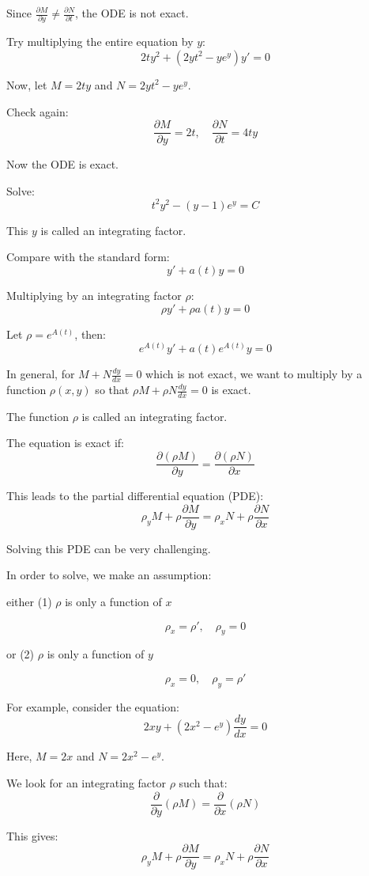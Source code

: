 \documentclass{article}
\begin{document}
Since \(\frac{\partial M}{\partial y} \neq \frac{\partial N}{\partial t}\), the ODE is not exact.

Try multiplying the entire equation by \( y \):
\[
2ty^2 + (2yt^2 - ye^y)y' = 0
\]

Now, let \( M = 2ty \) and \( N = 2yt^2 - ye^y \).

Check again:
\[
\frac{\partial M}{\partial y} = 2t, \quad \frac{\partial N}{\partial t} = 4ty
\]

Now the ODE is exact.

Solve:
\[
t^2y^2 - (y - 1)e^y = C
\]

This \( y \) is called an integrating factor.

Compare with the standard form:
\[
y' + a(t)y = 0
\]

Multiplying by an integrating factor \( \rho \):
\[
\rho y' + \rho a(t)y = 0
\]

Let \( \rho = e^{A(t)} \), then:
\[
e^{A(t)}y' + a(t)e^{A(t)}y = 0
\]

In general, for \( M + N \frac{dy}{dx} = 0 \) which is not exact, we want to multiply by a function \( \rho(x, y) \) so that \( \rho M + \rho N \frac{dy}{dx} = 0 \) is exact.

The function \( \rho \) is called an integrating factor.

The equation is exact if:
\[
\frac{\partial (\rho M)}{\partial y} = \frac{\partial (\rho N)}{\partial x}
\]

This leads to the partial differential equation (PDE):
\[
\rho_y M + \rho \frac{\partial M}{\partial y} = \rho_x N + \rho \frac{\partial N}{\partial x}
\]

Solving this PDE can be very challenging.

In order to solve, we make an assumption:

either (1) \(\rho\) is only a function of \(x\)

\[
\rho_x = \rho', \quad \rho_y = 0
\]

or (2) \(\rho\) is only a function of \(y\)

\[
\rho_x = 0, \quad \rho_y = \rho'
\]

For example, consider the equation:
\[
2xy + (2x^2 - e^y) \frac{dy}{dx} = 0
\]

Here, \(M = 2x\) and \(N = 2x^2 - e^y\).

We look for an integrating factor \(\rho\) such that:
\[
\frac{\partial}{\partial y} (\rho M) = \frac{\partial}{\partial x} (\rho N)
\]

This gives:
\[
\rho_y M + \rho \frac{\partial M}{\partial y} = \rho_x N + \rho \frac{\partial N}{\partial x}
\]
\end{document}

